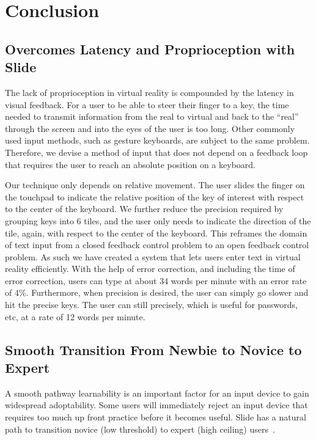 \section{Conclusion}

\subsection{Overcomes Latency and Proprioception with Slide}


The lack of proprioception in virtual reality is compounded by the latency in visual feedback.
For a user to be able to steer their finger to a key, the time needed to transmit information from the real to virtual and back to the ``real'' through the  screen and into the eyes of the user is too long.  Other commonly used input methods, such as gesture keyboards, are subject to the same problem.
Therefore, we devise a method of input that does not depend on a feedback loop that requires the user to reach an absolute position on a keyboard.  

Our technique only depends on relative movement. The user slides the finger on the touchpad to indicate the relative position of the key of interest with respect to the center of the keyboard.  We further reduce the precision required by grouping keys into 6 tiles, and the user only needs to indicate the direction of the tile, again, with respect to the center of the keyboard.
This reframes the domain of text input from a closed  feedback control problem to an open feedback control problem.
As such we have created a system that lets users enter text in virtual reality efficiently.  With the help of error correction, and including the time of error correction, users can type at about 34 words per minute with an error rate of 4\%.  Furthermore, when precision is desired, the user can simply go slower and hit the precise keys.  The user can still precisely, which is useful for passwords, etc, at a rate of 12 words per minute. 

\subsection{Smooth Transition From Newbie to Novice to Expert }

A smooth pathway learnability is an important factor for an input device to gain widespread adoptability.
Some users will immediately reject an input device that requires too much up front practice before it becomes useful.
Slide has a natural path to transition novice (low threshold) to expert (high ceiling) users~\cite{grover2013computational}.

